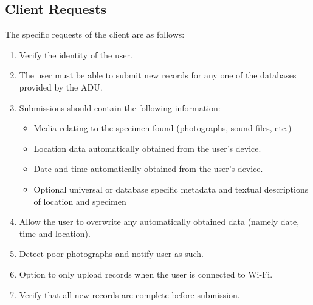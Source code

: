 \documentclass[
10pt, %
a4paper, %
oneside, %
headinclude,footinclude, %
BCOR5mm, %
]{scrartcl}
\begin{document}
\subsection{Client Requests} %
\label{sub:client_requests}

The specific requests of the client are as follows:
\begin{enumerate}
\item Verify the identity of the user.
\item The user must be able to submit new records for any one of the databases provided by the ADU.
\item Submissions should contain the following information:
\begin{itemize}
  \item Media relating to the specimen found (photographs, sound files, etc.)
  \item Location data automatically obtained from the user's device.
  \item Date and time automatically obtained from the user's device.
  \item Optional universal or database specific metadata and textual descriptions of location and specimen
\end{itemize}
\item Allow the user to overwrite any automatically obtained data (namely date, time and location).
\item Detect poor photographs and notify user as such.
\item Option to only upload records when the user is connected to Wi-Fi.
\item Verify that all new records are complete before submission.
\end{enumerate}


\end{document}
